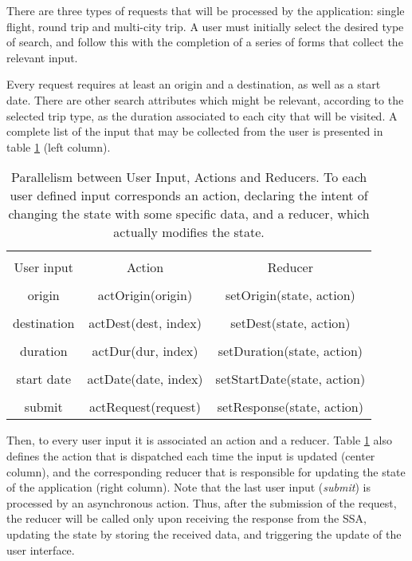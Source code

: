 There are three types of requests that will be processed by the application: single flight, round trip and multi-city trip. A user must initially select the desired type of search, and follow this with the completion of a series of forms that collect the relevant input. 

Every request requires at least an origin and a destination, as well as a start date. There are other search attributes which might be relevant, according to the selected trip type, as the duration associated to each city that will be visited. A complete list of the input that may be collected from the user is presented in table \ref{table:input_action_reducer} (left column). 


\begin{table}[htpb]
  \centering
  \caption{Parallelism between User Input, Actions and Reducers. To each user defined input corresponds an 
  action, declaring the intent of changing the state with some specific data, and a reducer, which actually modifies the state. }
  \setlength{\tabcolsep}{8mm}
  \label{table:input_action_reducer}
  \begin{tabular}{ccc}
  \hline
  \\[-0.75em]
  User input  & Action               & Reducer                    \\ \hline
  \\[-0.75em]
  origin      & actOrigin(origin)    & setOrigin(state, action)   \\
  \\[-0.75em]
  destination & actDest(dest, index) & setDest(state, action)     \\
  \\[-0.75em]
  duration    & actDur(dur, index)   & setDuration(state, action)     \\
  \\[-0.75em]
  start date  & actDate(date, index) & setStartDate(state, action)     \\
  \\[-0.75em]
  submit      & actRequest(request)  & setResponse(state, action) \\ \hline
  \end{tabular}
\end{table}


Then, to every user input it is associated an action and a reducer. Table \ref{table:input_action_reducer} also defines the action that is dispatched each time the input is updated (center column), and the corresponding reducer that is responsible for updating the state of the application (right column). Note that the last user input (\textit{submit}) is processed by an asynchronous action. Thus, after the submission of the request, the reducer will be called only upon receiving the response from the SSA, updating the state by storing the received data, and triggering the update of the user interface. 

